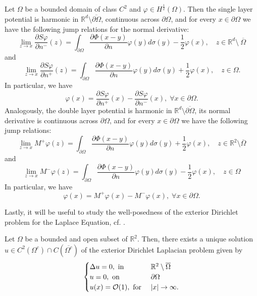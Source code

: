 \begin{proposition}\label{sl_jump}
    Let \(\Omega\) be a bounded domain of class \(C^2\) and \(\varphi \in H^\frac{1}{2}(\Omega)\). Then the single layer potential is harmonic in \(\mathbb{R}^d\setminus \overline{\partial\Omega}\), continuous across \(\partial\Omega\), and for every \(x \in \partial\Omega\) we have the following jump relations for the normal derivative:
    \[
        \lim_{z \rightarrow x} \frac{\partial S\varphi}{\partial n^-}(z) = \int_{\partial\Omega} \frac{\partial\Phi(x-y)}{\partial n}\varphi(y) d\sigma(y) - \frac{1}{2}\varphi(x), \quad z \in \mathbb{R}^d \setminus \ \overline{\Omega}
    \]
    and
    \[
        \lim_{z \rightarrow x} \frac{\partial S\varphi}{\partial n^+}(z) = \int_{\partial\Omega} \frac{\partial\Phi(x-y)}{\partial n}\varphi(y) d\sigma(y) + \frac{1}{2}\varphi(x), \quad z \in \Omega.
    \]
    In particular, we have
    \[
        \varphi(x) = \frac{\partial S\varphi}{\partial n^+}(x)-\frac{\partial S\varphi}{\partial n^-}(x), \; \forall x \in \partial\Omega.
    \]
    Analogously, the double layer potential is harmonic in \(\mathbb{R}^d\setminus \overline{\partial\Omega}\), its normal derivative is continuous across \(\partial\Omega\), and for every \(x \in \partial\Omega\) we have the following jump relations:
    \[
        \lim_{z \rightarrow x} M^+\varphi(z) = \int_{\partial\Omega} \frac{\partial\Phi(x-y)}{\partial n}\varphi(y) d\sigma(y) + \frac{1}{2}\varphi(x), \quad z \in \mathbb{R}^2\setminus\overline{\Omega}
    \]
    and
    \[
        \lim_{z \rightarrow x} M^-\varphi(z) = \int_{\partial\Omega} \frac{\partial\Phi(x-y)}{\partial n}\varphi(y) d\sigma(y) - \frac{1}{2}\varphi(x), \quad z \in \Omega
    \]
    In particular, we have
    \[
        \varphi(x) = M^+\varphi(x)-M^-\varphi(x), \; \forall x \in \partial\Omega.
    \]
\end{proposition}
Lastly, it will be useful to study the well-posedness of the exterior Dirichlet problem for the Laplace Equation, cf. \cite{salsa2016partial}.
\begin{theorem}
    Let \(\Omega\) be a bounded and open subset of \(\mathbb{R}^2\). Then, there exists a unique solution \(u \in C^2(\Omega^c) \cap C(\overline{\Omega^c})\) of the exterior Dirichlet Laplacian problem given by
    \[
        \begin{cases}
            \Delta u = 0, \text{ in } & \mathbb{R}^2\setminus \overline{\Omega}\\
            u = 0, \text{ on } & \partial \Omega\\
            u(x) = \mathcal{O}(1), \text{ for } & \abs{x} \rightarrow \infty.
        \end{cases}
    \]
\end{theorem}

